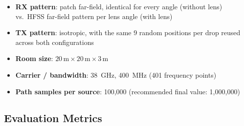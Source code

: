 \begin{itemize}
    \item \textbf{RX pattern}: patch far-field, identical for every angle (without lens) vs.\ HFSS far-field pattern per lens angle (with lens)
    \item \textbf{TX pattern}: isotropic, with the same 9 random positions per drop reused across both configurations
    \item \textbf{Room size}: $20\,\text{m}\times20\,\text{m}\times3\,\text{m}$
    \item \textbf{Carrier / bandwidth}: 38~GHz, 400~MHz (401 frequency points)
    \item \textbf{Path samples per source}: 100{,}000 (recommended final value: 1{,}000{,}000)
\end{itemize}

\subsection{Evaluation Metrics}

